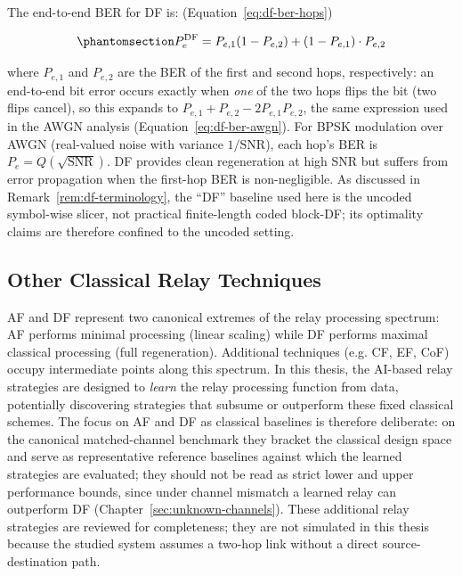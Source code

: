 The end-to-end BER for DF is: (Equation~\ref{eq:df-ber-hops})

\begin{equation}\protect\phantomsection\label{eq:df-ber-hops}{P_e^{\text{DF}} = P_{e,1}(1 - P_{e,2}) + (1 - P_{e,1}) \cdot P_{e,2}
}\end{equation}

where \(P_{e,1}\) and \(P_{e,2}\) are the BER of the first and second hops, respectively: an end-to-end bit error occurs exactly when \emph{one} of the two hops flips the bit (two flips cancel), so this expands to \(P_{e,1} + P_{e,2} - 2P_{e,1}P_{e,2}\), the same expression used in the AWGN analysis (Equation~\ref{eq:df-ber-awgn}). For BPSK modulation over AWGN (real-valued noise with variance \(1/\text{SNR}\)), each hop's BER is \(P_e = Q\left(\sqrt{\text{SNR}}\right)\). DF provides clean regeneration at high SNR but suffers from error propagation when the first-hop BER is non-negligible. As discussed in Remark~\ref{rem:df-terminology}, the ``DF'' baseline used here is the uncoded symbol-wise slicer, not practical finite-length coded block-DF; its optimality claims are therefore confined to the uncoded setting.

\subsection{Other Classical Relay Techniques}

AF and DF represent two canonical extremes of the relay processing spectrum: AF performs minimal processing (linear scaling) while DF performs maximal classical processing (full regeneration). Additional techniques (e.g. CF, EF, CoF) occupy intermediate points along this spectrum. In this thesis, the AI-based relay strategies are designed to \emph{learn} the relay processing function from data, potentially discovering strategies that subsume or outperform these fixed classical schemes. The focus on AF and DF as classical baselines is therefore deliberate: on the canonical matched-channel benchmark they bracket the classical design space and serve as representative reference baselines against which the learned strategies are evaluated; they should not be read as strict lower and upper performance bounds, since under channel mismatch a learned relay can outperform DF (Chapter~\ref{sec:unknown-channels}). These additional relay strategies are reviewed for completeness; they are not simulated in this thesis because the studied system assumes a two-hop link without a direct source-destination path.

